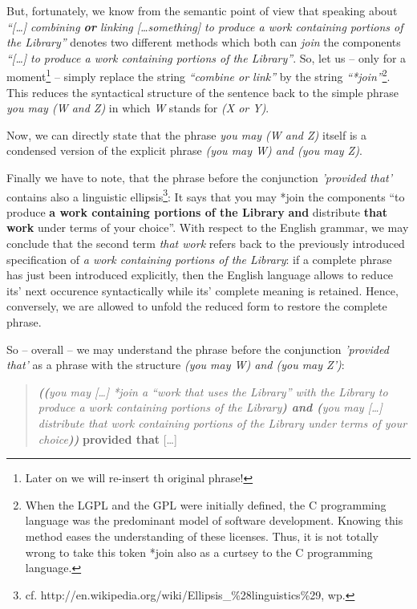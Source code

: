 But, fortunately, we know from the semantic point of view that speaking about
\emph{\enquote{[\ldots] combining \textbf{or} linking [\ldots something] to
produce a work containing portions of the Library}} denotes two different
methods which both can \emph{join} the components \emph{\enquote{[\ldots] to
produce a work containing portions of the Library}}. So, let us -- only for a
moment\footnote{Later on we will re-insert th original phrase!} -- simply
replace the string \emph{\enquote{combine or link}} by the string
\emph{\enquote{*join}}\footnote{When the LGPL and the GPL were initially
defined, the C programming language was the predominant model of software
development. Knowing this method eases the understanding of these licenses.
Thus, it is not totally wrong to take this token *join also as a curtsey to the
C programming language.}. This reduces the syntactical structure of the sentence
back to the simple phrase \emph{you may (W and Z)} in which \emph{W} stands for
\emph{(X or Y)}.

Now, we can directly state that the phrase \emph{you may (W and Z)} itself is a
condensed version of the explicit phrase \emph{ (you may W) and (you may Z)}.

Finally we have to note, that the phrase before the conjunction \emph{'provided
that'} contains also a linguistic ellipsis\footnote{cf.
http://en.wikipedia.org/wiki/Ellipsis\_\%28linguistics\%29, wp.
}: It says that you may *join the components \enquote{to produce \textbf{a work
containing portions of the Library} \textbf{and} distribute \textbf{that work}
under terms of your choice}. With respect to the English grammar, we may
conclude that the second term \emph{that work} refers back to the previously
introduced specification of \emph{a work containing portions of the Library}: if
a complete phrase has just been introduced explicitly, then the English language
allows to reduce its' next occurence syntactically while its' complete meaning
is retained. Hence, conversely, we are allowed to unfold the reduced form to
restore the complete phrase.

So -- overall -- we may understand the phrase before the conjunction
\emph{'provided that'} as a phrase with the structure \emph{(you may W) and (you
may Z')}:

\begin{quote}\noindent\emph{\textbf{((}you may [\ldots] \emph{*join} a
\enquote{work that uses the Library} with the Library to produce a work
containing portions of the Library\textbf{) and (}you may [\ldots] distribute
that work containing portions of the Library under terms of your
choice\textbf{))}} \textbf{provided that} [\ldots]\end{quote}

